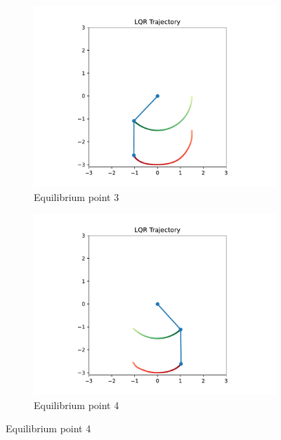 \begin{figure}[htb]
    \centering
    \begin{subfigure}[b]{0.7\textwidth}
        \centering
        \includegraphics[width=\linewidth]{img/Animation/Eq3.pdf}
        \caption{Equilibrium point 3}
        \label{fig:eq3}
    \end{subfigure}
    \hfill
    \begin{subfigure}[b]{0.7\textwidth}
        \centering
        \includegraphics[width=\linewidth]{img/Animation/Eq4.pdf}
        \caption{Equilibrium point 4}
        \label{fig:eq4}
    \end{subfigure}
    
    \vspace{1em}
    

\end{figure}
